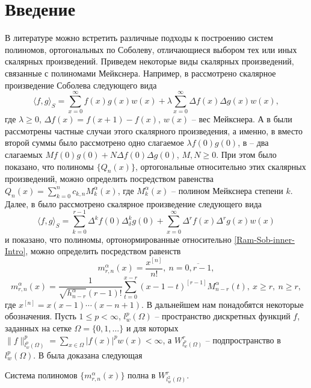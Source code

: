 \section{Введение}
В литературе можно встретить различные подходы к построению систем полиномов, ортогональных по Соболеву, отличающиеся выбором тех или иных скалярных произведений.
Приведем некоторые виды скалярных произведений, связанные с полиномами Мейкснера.
Например, в \cite{Ram-Ar-Go-Mar,Ram-Kh-Old} рассмотрено скалярное произведение Соболева следующего вида
$$
\langle f,g\rangle_S=\sum_{x=0}^{\infty}f(x)g(x)w(x)+\lambda\sum_{x=0}^{\infty}\Delta f(x)\Delta g(x)w(x),
$$
где $\lambda\ge 0$, $\Delta f(x)=f(x+1)-f(x)$, $w(x)$ -- вес Мейкснера. А в \cite{Ram-Bav1,Ram-Bav2} были рассмотрены частные случаи этого скалярного произведения, а именно, в \cite{Ram-Bav1} вместо второй суммы было рассмотрено одно слагаемое $\lambda f(0)g(0)$, в \cite{Ram-Bav2} -- два слагаемых $Mf(0)g(0)+N\Delta f(0)\Delta g(0)$, $M,N\ge 0$. При этом было показано, что полиномы $\{Q_n(x)\}$, ортогональные относительно этих скалярных произведений, можно определить посредством равенства $Q_n(x)=\sum_{k=0}^{n}c_{k,n}M_k^\alpha(x)$, где $M_k^\alpha(x)$ -- полином Мейкснера степени $k$. Далее, в \cite{Ram-Shar-VMJ,Ram-Shar-Sar} было рассмотрено скалярное произведение следующего вида
\begin{equation}\label{Ram-Sob-inner-Intro}
\langle f,g\rangle_S=\sum_{k=0}^{r-1}\Delta^kf(0)\Delta_\delta^kg(0)+\sum_{x=0}^\infty\Delta^rf(x)\Delta^rg(x)w(x)
\end{equation}
и показано, что полиномы, ортонормированные относительно \eqref{Ram-Sob-inner-Intro}, можно определить посредством равенств
$$
m_{r,n}^{\alpha}(x)=\frac{x^{[n]}}{n!},\ n=\overline{0,r-1},
$$
$$
m_{r,n}^{\alpha}(x)=
\frac{1}{\sqrt{h_{n-r}^\alpha}(r-1)!}\sum_{t=0}^{x-r}(x-1-t)^{[r-1]}M_{n-r}^\alpha(t),\ x\ge r,\ n\ge r,
$$
где $x^{[n]}=x(x-1)\cdots(x-n+1)$.
В дальнейшем нам понадобятся некоторые обозначения. Пусть $1\le p<\infty$, $l_w^p(\Omega)$ -- пространство дискретных функций $f$, заданных на сетке $\Omega=\{0, 1, \ldots\}$ и для которых $\|f\|_{l_{w}^p(\Omega)}^p=\sum_{x\in\Omega}|f(x)|^pw(x)<\infty$, а $W^r_{l_{w}^p(\Omega)}$ -- подпространство в $l_{w}^p(\Omega)$.
В \cite{Ram-Shar-Sar} была доказана следующая

\begin{theoremA}\label{GRM-th-B}
Система полиномов $\{m_{r,n}^\alpha(x)\}$ полна в $W^r_{l_w^2(\Omega)}$.
\end{theoremA}

